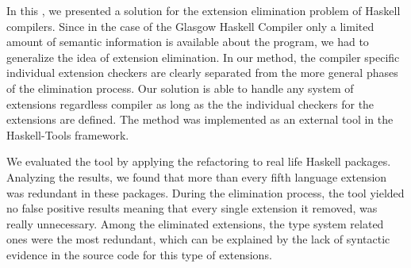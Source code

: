 \documentclass[main.tex]{subfiles}
\begin{document}
	
	In this \paper{}, we presented a solution for the extension elimination problem of Haskell compilers. Since in the case of the Glasgow Haskell Compiler only a limited amount of semantic information is available about the program, we had to generalize the idea of extension elimination. In our method, the compiler specific individual extension checkers are clearly separated from the more general phases of the elimination process. Our solution is able to handle any system of extensions regardless compiler as long as the the individual checkers for the extensions are defined. The method was implemented as an external tool in the Haskell-Tools framework.
	
	We evaluated the tool by applying the refactoring to real life Haskell packages. Analyzing the results, we found that more than every fifth language extension was redundant in these packages. During the elimination process, the tool yielded no false positive results meaning that every single extension it removed, was really unnecessary. Among the eliminated extensions, the type system related ones were the most redundant, which can be explained by the lack of syntactic evidence in the source code for this type of extensions.
	
\end{document}
